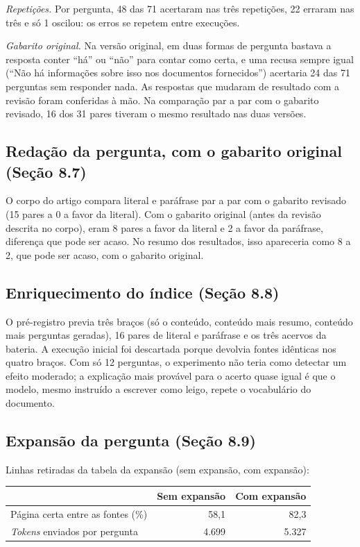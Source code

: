 \documentclass[12pt]{article}
\begin{document}
\textit{Repetições.} Por pergunta, 48 das 71 acertaram nas três repetições, 22 erraram nas três e só 1 oscilou: os erros se repetem entre execuções.

\textit{Gabarito original.} Na versão original, em duas formas de pergunta bastava a resposta conter ``há'' ou ``não'' para contar como certa, e uma recusa sempre igual (``Não há informações sobre isso nos documentos fornecidos'') acertaria 24 das 71 perguntas sem responder nada. As respostas que mudaram de resultado com a revisão foram conferidas à mão. Na comparação par a par com o gabarito revisado, 16 dos 31 pares tiveram o mesmo resultado nas duas versões.

\subsection*{Redação da pergunta, com o gabarito original (Seção 8.7)}

O corpo do artigo compara literal e paráfrase par a par com o gabarito revisado (15 pares a 0 a favor da literal). Com o gabarito original (antes da revisão descrita no corpo), eram 8 pares a favor da literal e 2 a favor da paráfrase, diferença que pode ser acaso. No resumo dos resultados, isso apareceria como 8 a 2, que pode ser acaso, com o gabarito original.

\subsection*{Enriquecimento do índice (Seção 8.8)}

O pré-registro previa três braços (só o conteúdo, conteúdo mais resumo, conteúdo mais perguntas geradas), 16 pares de literal e paráfrase e os três acervos da bateria. A execução inicial foi descartada porque devolvia fontes idênticas nos quatro braços. Com só 12 perguntas, o experimento não teria como detectar um efeito moderado; a explicação mais provável para o acerto quase igual é que o modelo, mesmo instruído a escrever como leigo, repete o vocabulário do documento.

\subsection*{Expansão da pergunta (Seção 8.9)}

Linhas retiradas da tabela da expansão (sem expansão, com expansão):

\begin{tabular}{lrr}
\toprule
 & Sem expansão & Com expansão \\
\midrule
Página certa entre as fontes (\%)                  & 58,1 & 82,3 \\
\emph{Tokens} enviados por pergunta                & 4.699 & 5.327 \\
\bottomrule
\end{tabular}
\end{document}
